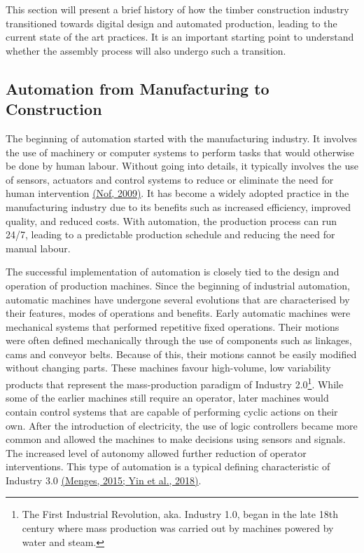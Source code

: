 \documentclass[11pt]{book}
\begin{document}
This section will present a brief history of how the timber construction industry transitioned towards digital design and automated production, leading to the current state of the art practices. It is an important starting point to understand whether the assembly process will also undergo such a transition. 

\subsection{Automation from Manufacturing to Construction}

The beginning of automation started with the manufacturing industry. It involves the use of machinery or computer systems to perform tasks that would otherwise be done by human labour. Without going into details, it typically involves the use of sensors, actuators and control systems to reduce or eliminate the need for human intervention \href{https://www.zotero.org/google-docs/?WadYaU}{(Nof, 2009)}. It has become a widely adopted practice in the manufacturing industry due to its benefits such as increased efficiency, improved quality, and reduced costs. With automation, the production process can run 24/7, leading to a predictable production schedule and reducing the need for manual labour. 

The successful implementation of automation is closely tied to the design and operation of production machines. Since the beginning of industrial automation, automatic machines have undergone several evolutions that are characterised by their features, modes of operations and benefits. Early automatic machines were mechanical systems that performed repetitive fixed operations. Their motions were often defined mechanically through the use of components such as linkages, cams and conveyor belts. Because of this, their motions cannot be easily modified without changing parts. These machines favour high-volume, low variability products that represent the mass-production paradigm of Industry 2.0\footnote{ The First Industrial Revolution, aka. Industry 1.0, began in the late 18th century where mass production was carried out by machines powered by water and steam.}. While some of the earlier machines still require an operator, later machines would contain control systems that are capable of performing cyclic actions on their own. After the introduction of electricity, the use of logic controllers became more common and allowed the machines to make decisions using sensors and signals. The increased level of autonomy allowed further reduction of operator interventions. This type of automation is a typical defining characteristic of Industry 3.0 \href{https://www.zotero.org/google-docs/?idxPsd}{(Menges, 2015; Yin et al., 2018)}. 
\end{document}
